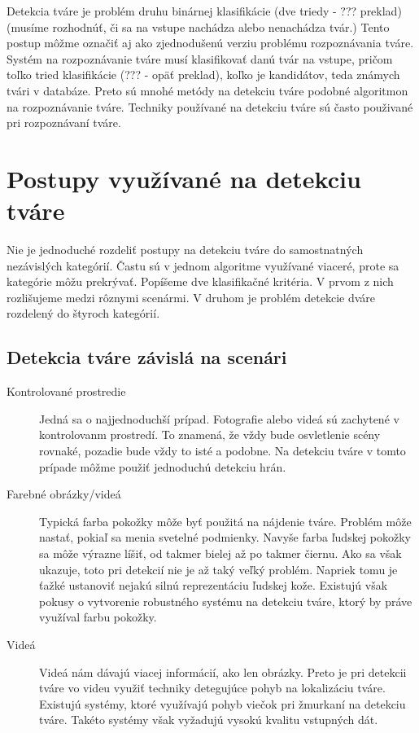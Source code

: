 Detekcia tváre je problém druhu binárnej klasifikácie (dve triedy - ??? preklad) (musíme rozhodnúť, či sa na vstupe nachádza alebo nenachádza tvár.)
Tento postup môžme označiť aj ako zjednodušenú verziu problému rozpoznávania tváre. 
Systém na rozpoznávanie tváre musí klasifikovať danú tvár na vstupe, pričom toľko tried klasifikácie (??? - opäť preklad), koľko je kandidátov, teda známych tvári v databáze.
Preto sú mnohé metódy na detekciu tváre podobné algoritmon na rozpoznávanie tváre. 
Techniky používané na detekciu tváre sú často použivané pri rozpoznávaní tváre.

\section{Postupy využívané na detekciu tváre}
Nie je jednoduché rozdeliť postupy na detekciu tváre do samostnatných nezávislých kategórií.
Častu sú v jednom algoritme využívané viaceré, prote sa kategórie môžu prekrývať.
Popíšeme dve klasifikačné kritéria. V prvom z nich rozlišujeme medzi rôznymi scenármi.
V druhom je problém detekcie dváre rozdelený do štyroch kategórií.
 

\subsection{Detekcia tváre závislá na scenári}
\begin{description}
  \item[Kontrolované prostredie] 
  Jedná sa o najjednoduchší prípad. Fotografie alebo videá sú zachytené v kontrolovanm prostredí.
  To znamená, že vždy bude osvletlenie scény rovnaké, pozadie bude vždy to isté a podobne.
  Na detekciu tváre v tomto prípade môžme použiť jednoduchú detekciu hrán.
  \item[Farebné obrázky/videá]
  Typická farba pokožky môže byť použitá na nájdenie tváre. 
  Problém môže nastať, pokiaľ sa menia svetelné podmienky. 
  Navyše farba ľudskej pokožky sa môže výrazne líšiť, od takmer bielej až po takmer čiernu.
  Ako sa však ukazuje, toto pri detekcií nie je až taký veľký problém.
  Napriek tomu je ťažké ustanoviť nejakú silnú reprezentáciu ľudskej kože.
  Existujú však pokusy o vytvorenie robustného systému na detekciu tváre, ktorý by práve využíval farbu pokožky.
  \item[Videá]
  Videá nám dávajú viacej informácií, ako len obrázky. 
  Preto je pri detekcii tváre vo videu využiť techniky detegujúce pohyb na lokalizáciu tváre.
  Existujú systémy, ktoré využívajú pohyb viečok pri žmurkaní na detekciu tváre.
  Takéto systémy však vyžadujú vysokú kvalitu vstupných dát.
\end{description}

